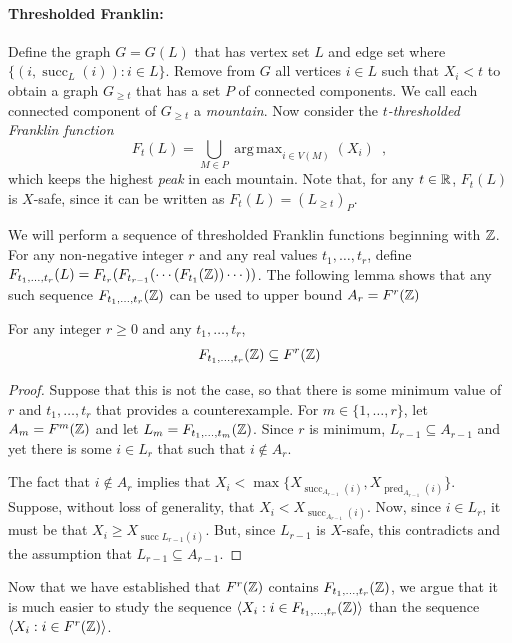 \documentclass{patmorin}
\DeclareMathOperator*{\argmax}{arg\,max}
\DeclareMathOperator{\cw}{succ}
\DeclareMathOperator{\ccw}{pred}
\begin{document}
\paragraph{Thresholded Franklin:}
Define the graph $G=G(L)$ that has vertex set $L$ and edge set where
$\{(i,\cw_L(i)): i\in L\}$. Remove from $G$ all vertices $i\in L$
such that $X_i < t$ to obtain a graph $G_{\ge t}$ that has a set $P$
of connected components.  We call each connected component of $G_{\ge
t}$ a \emph{mountain}.  Now consider the \emph{$t$-thresholded Franklin
function}
\[
    F_t(L) = \bigcup_{M\in P} \argmax_{i\in V(M)}(X_i) \enspace ,
\]
which keeps the highest \emph{peak} in each mountain.
Note that, for any $t\in\mathbb{R}$, $F_t(L)$ is $X$-safe, since it can be
written as $F_t(L) = (L_{\ge t})_P$.

We will perform a sequence of thresholded Franklin functions
beginning with $\mathbb{Z}$.  For any non-negative integer $r$ and any
real values $t_1,\ldots,t_r$, define $F_{t_1,\ldots,t_r}(L) =
F_{t_r}(F_{t_{r-1}}(\cdots(F_{t_1}(\mathbb{Z}))\cdots ))$.  The following lemma
shows that any such sequence $F_{t_1,\ldots,t_r}(\mathbb{Z})$ can be used to upper
bound $A_r=F^r(\mathbb{Z})$

\begin{lem}
   For any integer $r\ge 0$ and any $t_1,\ldots,t_r$,
   \[  F_{t_1,\ldots,t_r}(\mathbb{Z}) \subseteq F^{r}(\mathbb{Z})   \]
\end{lem}

\begin{proof}
   Suppose that this is not the case, so that there is some
   minimum value of $r$ and $t_1,\ldots,t_r$ that provides a
   counterexample.  For $m\in\{1,\ldots,r\}$, let $A_m=F^{m}(\mathbb{Z})$ and let
   $L_m=F_{t_1,\ldots,t_m}(\mathbb{Z})$.  Since $r$ is minimum, $L_{r-1}\subseteq
   A_{r-1}$ and yet there is some $i\in L_r$ that such that $i\not\in
   A_r$.

   The fact that $i\not\in A_r$ implies that $X_i
   < \max\{X_{\cw_{A_{r-1}}(i)},X_{\ccw_{A_{r-1}}(i)}\}$.
   Suppose, without loss of generality, that $X_i < X_{\cw_{A_{r-1}}(i)}$.
   Now, since $i\in L_r$, it must be that $X_i
   \ge X_{\cw{L_{r-1}}(i)}$.  But, since $L_{r-1}$ is
   $X$-safe, this contradicts  and the assumption that
   $L_{r-1}\subseteq A_{r-1}$.
\end{proof}

Now that we have established that $F^r(\mathbb{Z})$ contains $F_{t_1,\ldots,t_r
}(\mathbb{Z})$, we argue that it is much easier to study the sequence $\langle
X_i:i\in F_{t_1,\ldots,t_r}(\mathbb{Z})\rangle$ than the sequence $\langle X_i:
i\in F^r(\mathbb{Z})\rangle$.
\end{document}
